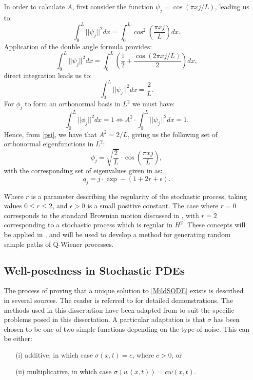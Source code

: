 \documentclass[12pt]{article}
\begin{document}
In order to calculate $A$, first consider the function $\psi_j = \cos(\pi xj/L)$, leading us to:
\begin{equation*}
    \int_0^L ||\psi_j||^2dx = \int_0^L \cos^2\left(\frac{\pi xj}{L}\right) dx.
\end{equation*}
Application of the double angle formula provides:
\begin{equation*}
    \int_0^L ||\psi_j||^2dx = \int_0^L \left(\frac{1}{2} + \frac{\cos(2\pi xj/L)}{2}\right)dx,
\end{equation*}
direct integration leads us to:
\begin{equation}\label{psi}
    \int_0^L ||\psi_j||^2dx = \frac{2}{L}.
\end{equation}
For $\phi_j$ to form an orthonormal basis in $L^2$ we must have:
\begin{equation*}
    \int_0^L ||\phi_j||^2dx = 1 \Longleftrightarrow A^2\cdot\int_0^L||\psi_j||^2dx = 1.
\end{equation*}
Hence, from \eqref{psi}, we have that $A^2 = 2/L$, giving us the following set of  orthonormal eigenfunctions in $L^2$:
\begin{equation}\label{eigenfunctions}
    \phi_j = \sqrt{\frac{2}{L}}\cdot \cos\left(\frac{\pi xj}{L}\right),
\end{equation}
with the corresponding set of eigenvalues given in \cite{Lord} as:
\begin{equation}\label{eigenvalues}
    q_j = j\cdot\exp-\left(1+2r+\epsilon\right).
\end{equation}

Where $r$ is a parameter describing the regularity of the stochastic process, taking values $0\leq r\leq2$, and $\epsilon>0$ is a small positive constant. The case where $r = 0$ corresponds to the standard Brownian motion discussed in , with $r=2$ corresponding to a stochastic process which is regular in $H^2$. These concepts will be applied in , and will be used to develop a method for generating random sample paths of Q-Wiener processes.

\subsection{Well-posedness in Stochastic PDEs}
The process of proving that a unique solution to \eqref{MildSODE} exists is described in several sources. The reader is referred to \cite{Chow, Lord} for detailed demonstrations. The methods used in this dissertation have been adapted from \cite{Lord, Chow} to suit the specific problems posed in this dissertation. A particular adaptation is that $\sigma$ has been chosen to be one of two simple functions depending on the type of noise. This can be either:
\begin{enumerate}
    \item [(i)] additive, in which case $\sigma(x,t) = c$, where $c > 0$, or
    \item [(ii)] multiplicative, in which case $\sigma(w(x,t)) = cw(x,t)$.
\end{enumerate}
\end{document}
